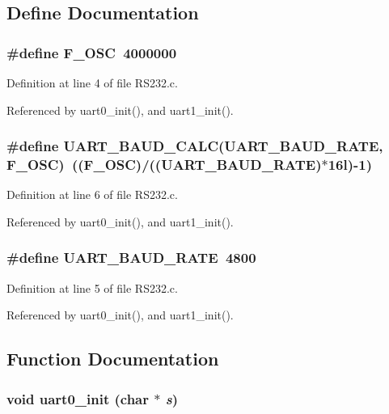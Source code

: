 \subsection{Define Documentation}
\subsubsection{\setlength{\rightskip}{0pt plus 5cm}\#define F\_\-OSC~4000000}\label{_r_s232_8c_3aee3beceffb391d6aa3012c48f0a35b}




Definition at line 4 of file RS232.c.

Referenced by uart0\_\-init(), and uart1\_\-init().
\subsubsection{\setlength{\rightskip}{0pt plus 5cm}\#define UART\_\-BAUD\_\-CALC(UART\_\-BAUD\_\-RATE, F\_\-OSC)~((F\_\-OSC)/((UART\_\-BAUD\_\-RATE)$\ast$16l)-1)}\label{_r_s232_8c_64c2172580e19b5eeebbb67d966b7a0d}




Definition at line 6 of file RS232.c.

Referenced by uart0\_\-init(), and uart1\_\-init().
\subsubsection{\setlength{\rightskip}{0pt plus 5cm}\#define UART\_\-BAUD\_\-RATE~4800}\label{_r_s232_8c_615aed21aa6825462b7c17b0c238ffe2}




Definition at line 5 of file RS232.c.

Referenced by uart0\_\-init(), and uart1\_\-init().

\subsection{Function Documentation}
\subsubsection{\setlength{\rightskip}{0pt plus 5cm}void uart0\_\-init (char $\ast$ {\em s})}\label{_r_s232_8c_50c47d414047e85285f33c68ce066c0a}




